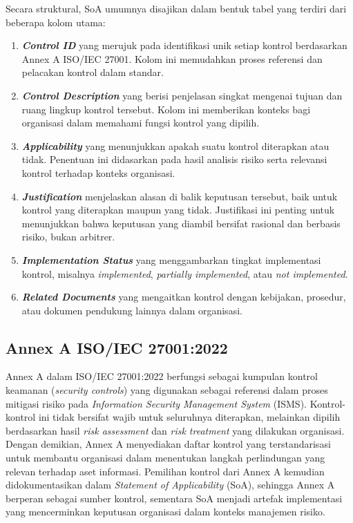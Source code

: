 Secara struktural, SoA umumnya disajikan dalam bentuk tabel yang terdiri dari beberapa kolom utama:

\begin{enumerate}
	\item \textbf{\textit{Control ID}} yang merujuk pada identifikasi unik setiap kontrol berdasarkan Annex A ISO/IEC 27001. Kolom ini memudahkan proses referensi dan pelacakan kontrol dalam standar.
	\item \textbf{\textit{Control Description}} yang berisi penjelasan singkat mengenai tujuan dan ruang lingkup kontrol tersebut. Kolom ini memberikan konteks bagi organisasi dalam memahami fungsi kontrol yang dipilih.
	\item \textbf{\textit{Applicability}} yang menunjukkan apakah suatu kontrol diterapkan atau tidak. Penentuan ini didasarkan pada hasil analisis risiko serta relevansi kontrol terhadap konteks organisasi.
	\item \textbf{\textit{Justification}} menjelaskan alasan di balik keputusan tersebut, baik untuk kontrol yang diterapkan maupun yang tidak. Justifikasi ini penting untuk menunjukkan bahwa keputusan yang diambil bersifat rasional dan berbasis risiko, bukan arbitrer.
	\item \textbf{\textit{Implementation Status}} yang menggambarkan tingkat implementasi kontrol, misalnya \textit{implemented}, \textit{partially implemented}, atau \textit{not implemented}.
	\item \textbf{\textit{Related Documents}} yang mengaitkan kontrol dengan kebijakan, prosedur, atau dokumen pendukung lainnya dalam organisasi.
\end{enumerate}

\subsection{Annex A ISO/IEC 27001:2022}

Annex A dalam ISO/IEC 27001:2022 berfungsi sebagai kumpulan kontrol keamanan (\textit{security controls}) yang digunakan sebagai referensi dalam proses mitigasi risiko pada \textit{Information Security Management System} (ISMS). Kontrol-kontrol ini tidak bersifat wajib untuk seluruhnya diterapkan, melainkan dipilih berdasarkan hasil \textit{risk assessment} dan \textit{risk treatment} yang dilakukan organisasi. Dengan demikian, Annex A menyediakan daftar kontrol yang terstandarisasi untuk membantu organisasi dalam menentukan langkah perlindungan yang relevan terhadap aset informasi. Pemilihan kontrol dari Annex A kemudian didokumentasikan dalam \textit{Statement of Applicability} (SoA), sehingga Annex A berperan sebagai sumber kontrol, sementara SoA menjadi artefak implementasi yang mencerminkan keputusan organisasi dalam konteks manajemen risiko.

